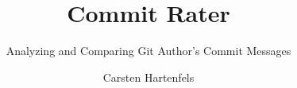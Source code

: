 \documentclass{llncs}
\begin{document}
\title{Commit Rater}
\subtitle{Analyzing and Comparing Git Author's Commit Messages}
\author{Carsten Hartenfels}%

\maketitle









\appendix




\end{document}
